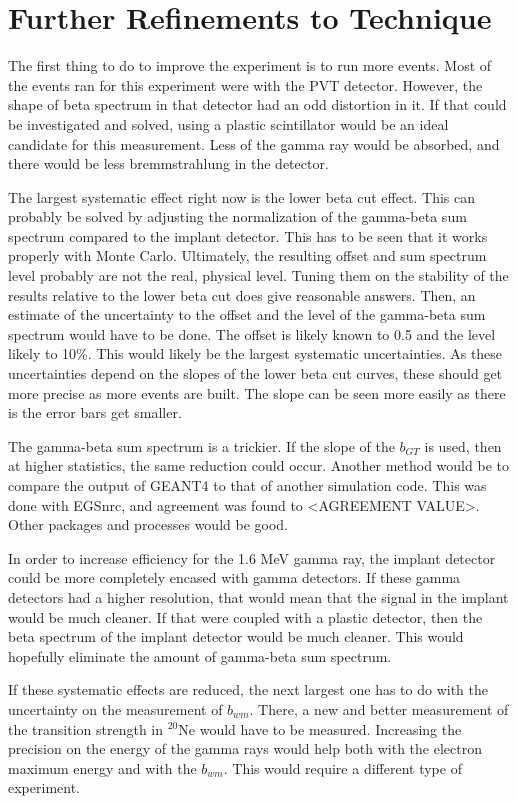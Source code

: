 \documentclass[../MaxHughesThesis.tex]{subfiles}
\begin{document}
\section{Further Refinements to Technique}
The first thing to do to improve the experiment is to run more events.
Most of the events ran for this experiment were with the PVT detector.
However, the shape of beta spectrum in that detector had an odd distortion in it.
If that could be investigated and solved, using a plastic scintillator would be an ideal candidate for this measurement.
Less of the gamma ray would be absorbed, and there would be less bremmstrahlung in the detector.

The largest systematic effect right now is the lower beta cut effect. 
This can probably be solved by adjusting the normalization of the gamma-beta sum spectrum compared to the implant detector. 
This has to be seen that it works properly with Monte Carlo.
Ultimately, the resulting offset and sum spectrum level probably are not the real, physical level.
Tuning them on the stability of the results relative to the lower beta cut does give reasonable answers.
Then, an estimate of the uncertainty to the offset and the level of the gamma-beta sum spectrum would have to be done.
The offset is likely known to 0.5 and the level likely to 10\%.
This would likely be the largest systematic uncertainties.
As these uncertainties depend on the slopes of the lower beta cut curves, these should get more precise as more events are built.
The slope can be seen more easily as there is the error bars get smaller.

The gamma-beta sum spectrum is a trickier. 
If the slope of the $b_{GT}$ is used, then at higher statistics, the same reduction could occur. 
Another method would be to compare the output of GEANT4 to that of another simulation code.
This was done with EGSnrc, and agreement was found to <AGREEMENT VALUE>.
Other packages and processes would be good.

In order to increase efficiency for the 1.6 MeV gamma ray, the implant detector could be more completely encased with gamma detectors.
If these gamma detectors had a higher resolution, that would mean that the signal in the implant would be much cleaner.
If that were coupled with a plastic detector, then the beta spectrum of the implant detector would be much cleaner.
This would hopefully eliminate the amount of gamma-beta sum spectrum.

If these systematic effects are reduced, the next largest one has to do with the uncertainty on the measurement of $b_{wm}$.
There, a new and better measurement of the transition strength in $^{20}$Ne would have to be measured.
Increasing the precision on the energy of the gamma rays would help both with the electron maximum energy and with the $b_{wm}$.
This would require a different type of experiment.
\end{document}
